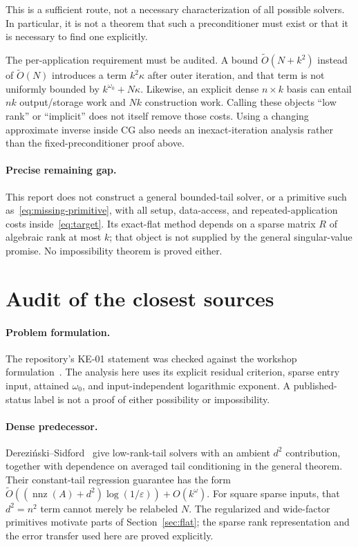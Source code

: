 \documentclass[11pt,a4paper]{article}
\newcommand{\nnz}{\operatorname{nnz}}
\newcommand{\softO}{\widetilde O}
\newcommand{\eps}{\varepsilon}
\theoremstyle{definition}
\theoremstyle{remark}
\begin{document}
This is a sufficient route, not a necessary characterization of all possible solvers. In particular, it is not a theorem that such a preconditioner must exist or that it is necessary to find one explicitly.

The per-application requirement must be audited. A bound $\softO(N+k^2)$ instead of $\softO(N)$ introduces a term $k^2\kappa$ after outer iteration, and that term is not uniformly bounded by $k^{\omega_0}+N\kappa$. Likewise, an explicit dense $n\times k$ basis can entail $nk$ output/storage work and $Nk$ construction work. Calling these objects ``low rank'' or ``implicit'' does not itself remove those costs. Using a changing approximate inverse inside CG also needs an inexact-iteration analysis rather than the fixed-preconditioner proof above.

\paragraph{Precise remaining gap.}
This report does not construct a general bounded-tail solver, or a primitive such as~\eqref{eq:missing-primitive}, with all setup, data-access, and repeated-application costs inside~\eqref{eq:target}. Its exact-flat method depends on a sparse matrix $R$ of algebraic rank at most $k$; that object is not supplied by the general singular-value promise. No impossibility theorem is proved either.

\section{Audit of the closest sources}
\label{sec:sources}
\paragraph{Problem formulation.}
The repository's KE-01 statement was checked against the workshop formulation~\cite{ke01,workshop}. The analysis here uses its explicit residual criterion, sparse entry input, attained $\omega_0$, and input-independent logarithmic exponent. A published-status label is not a proof of either possibility or impossibility.

\paragraph{Dense predecessor.}
Derezi\'nski--Sidford~\cite[Theorems 3 and 29]{ds} give low-rank-tail solvers with an ambient $d^2$ contribution, together with dependence on averaged tail conditioning in the general theorem. Their constant-tail regression guarantee has the form
$\softO((\nnz(A)+d^2)\log(1/\eps))+O(k^\omega)$.
For square sparse inputs, that $d^2=n^2$ term cannot merely be relabeled $N$. The regularized and wide-factor primitives motivate parts of Section~\ref{sec:flat}; the sparse rank representation and the error transfer used here are proved explicitly.
\end{document}
